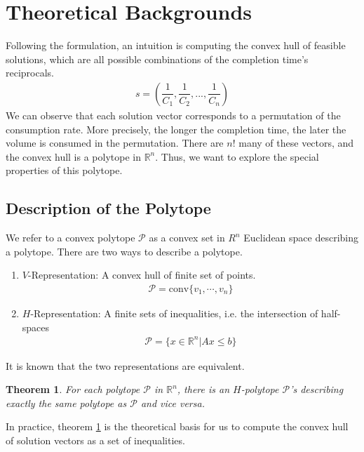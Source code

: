 \documentclass[12pt,letterpaper]{article}
\newcommand*{\R}{\mathbb{R}}
\newcommand{\Poly}{\mathcal{P}}
\newtheorem{theorem}{Theorem}[section]
\begin{document}
\section{Theoretical Backgrounds}
Following the formulation, an intuition is computing the convex hull of feasible solutions, 
which are all possible combinations of the completion time's reciprocals. 
\begin{align*}
 s = \left( \dfrac{1}{C_1}, \dfrac{1}{C_2}, ..., \dfrac{1}{C_n}\right)
\end{align*} 
We can observe that each solution vector corresponds to a permutation of the consumption rate. 
More precisely, the longer the completion time, the later the volume is consumed in the permutation.
There are $n!$ many of these vectors, and the convex hull is a polytope in $\R^n$. 
Thus, we want to explore the special properties of this polytope.

\subsection{Description of the Polytope}
We refer to a convex polytope $\Poly$ as a convex set in $R^n$ Euclidean space describing a polytope. 
There are two ways to describe a polytope.
\begin{enumerate}
    \item $V$-Representation: A convex hull of finite set of points. 
    \begin{align*}
        \Poly = \text{conv}\{v_1, \cdots, v_n \}
    \end{align*}
    \item $H$-Representation: A finite sets of inequalities, i.e. the intersection of half-spaces
    \begin{align*}
        \Poly = \{x \in \R^n | Ax \leq b \}
    \end{align*}
\end{enumerate}
It is known that the two representations are equivalent. 
\begin{theorem}
    \label{thm:polytope}
    For each polytope $\Poly$ in $\R^n$, there is an $H$-polytope $\Poly$'s 
    describing exactly the same polytope as $\Poly$ and vice versa.
\end{theorem}
In practice, theorem \ref{thm:polytope} is the theoretical basis for us to 
compute the convex hull of solution vectors as a set of inequalities.
\end{document}
